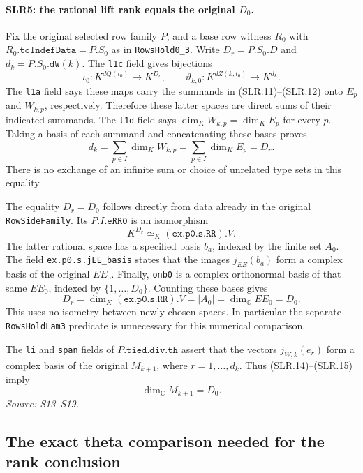 \paragraph{SLR5: the rational lift rank equals the original $D_0$.}
\label{claim:SLR5}
Fix the original selected row family $P$, and a base row witness
$R_0$ with $R_0.\texttt{toIndefData}=P.S_0$ as in
\texttt{RowsHold0\_3}.  Write $D_r=P.S_0.D$ and
$d_k=P.S_0.\texttt{dW}(k)$.  The \texttt{l1c} field gives bijections
\[
 \iota_0:K^{dQ(t_0)}\longrightarrow K^{D_r},\qquad
 \vartheta_{k,0}:K^{dZ(k,t_0)}\longrightarrow K^{d_k}.
                                                               \tag{SLR.13}
\]
The \texttt{l1a} field says these maps carry the summands in
(SLR.11)--(SLR.12) onto $E_p$ and $W_{k,p}$, respectively.
Therefore these latter spaces are direct sums of their indicated
summands.  The \texttt{l1d} field says
$\dim_KW_{k,p}=\dim_KE_p$ for every $p$.  Taking a basis of each
summand and concatenating these bases proves
\[
 d_k=\sum_{p\in I}\dim_KW_{k,p}
       =\sum_{p\in I}\dim_KE_p=D_r.                     \tag{SLR.14}
\]
There is no exchange of an infinite sum or choice of unrelated type
sets in this equality.

The equality $D_r=D_0$ follows directly from data already in the
original \texttt{RowSideFamily}.  Its $P.I.\texttt{eRR0}$ is an
isomorphism
\[
                 K^{D_r}\simeq_K (\texttt{ex.p0.s.RR}).V.
\]
The latter rational space has a specified basis $b_a$, indexed by the
finite set $A_0$.  The field \texttt{ex.p0.s.jEE\_basis} states that
the images $j_{EE}(b_a)$ form a complex basis of the original
$EE_0$.  Finally, \texttt{onb0} is a complex orthonormal basis of
that same $EE_0$, indexed by $\{1,\ldots,D_0\}$.  Counting these
bases gives
\[
          D_r=\dim_K(\texttt{ex.p0.s.RR}).V
              =|A_0|=\dim_{\mathbb C}EE_0=D_0.           \tag{SLR.15}
\]
This uses no isometry between newly chosen spaces.  In particular the
separate \texttt{RowsHoldLam3} predicate is unnecessary for this
numerical comparison.

The \texttt{li} and \texttt{span} fields of
$P.\texttt{tied.div.th}$ assert that the vectors
$j_{W,k}(e_r)$ form a complex basis of the original $M_{k+1}$,
where $r=1,\ldots,d_k$.  Thus (SLR.14)--(SLR.15) imply
\[
                      \dim_{\mathbb C}M_{k+1}=D_0.       \tag{SLR.16}
\]
\emph{Source: S13--S19.}

\subsection{The exact theta comparison needed for the rank conclusion}

